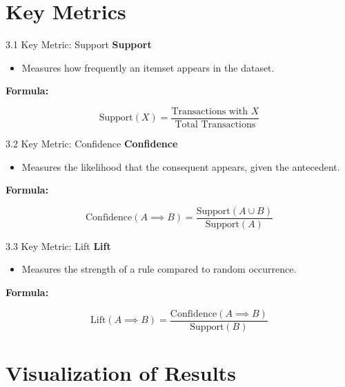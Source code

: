 \documentclass{beamer}
\begin{document}
\section{Key Metrics}

\begin{frame}{3.1 Key Metric: Support}
    \textbf{Support} \\
    \begin{itemize}
        \item Measures how frequently an itemset appears in the dataset.
    \end{itemize}
    \vspace{1em}
    \textbf{Formula:}
    

\[
    \text{Support}(X) = \frac{\text{Transactions with } X}{\text{Total Transactions}}
    \]


\end{frame}

\begin{frame}{3.2 Key Metric: Confidence}
    \textbf{Confidence} \\
    \begin{itemize}
        \item Measures the likelihood that the consequent appears, given the antecedent.
    \end{itemize}
    \vspace{1em}
    \textbf{Formula:}
    

\[
    \text{Confidence}(A \implies B) = \frac{\text{Support}(A \cup B)}{\text{Support}(A)}
    \]


\end{frame}

\begin{frame}{3.3 Key Metric: Lift}
    \textbf{Lift} \\
    \begin{itemize}
        \item Measures the strength of a rule compared to random occurrence.
    \end{itemize}
    \vspace{1em}
    \textbf{Formula:}
    

\[
    \text{Lift}(A \implies B) = \frac{\text{Confidence}(A \implies B)}{\text{Support}(B)}
    \]


\end{frame}

\section{Visualization of Results}
\end{document}
